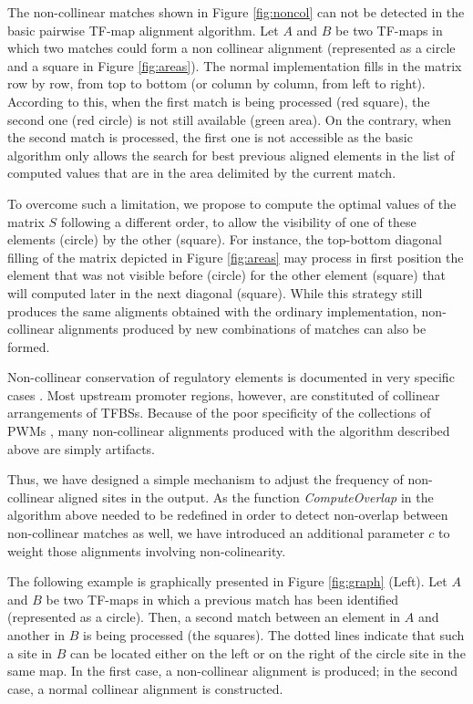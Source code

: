 
The non-collinear matches shown in Figure \ref{fig:noncol} can not be detected
in the basic pairwise TF-map alignment algorithm. Let $A$ and $B$ be two
TF-maps in which two matches could form a non collinear alignment
(represented as a circle and a square in Figure \ref{fig:areas}). The
normal implementation fills in the matrix row by row, from top to bottom
(or column by column, from left to right).
According to this, when the first match is being processed (red square),
the second one (red circle) is not still available (green area). On the
contrary, when the second match is processed, the first one is not
accessible as the basic algorithm only allows the search for best previous
aligned elements in the list of computed values that are in the area
delimited by the current match.

To overcome such a limitation, we propose to compute the optimal values of the
matrix $S$ following a different order, to allow the visibility of one of
these elements (circle) by the other (square). For instance, the top-bottom
diagonal filling of the matrix depicted in Figure \ref{fig:areas} may process
in first position the element that was not visible before (circle) for the
other element (square) that will computed later in the next diagonal (square).
While this strategy still produces the same aligments obtained with the
ordinary implementation, non-collinear alignments produced by new
combinations of matches can also be formed.

Non-collinear conservation of regulatory elements is documented
in very specific cases \citep{nix:2005a}. Most upstream promoter
regions, however, are constituted of collinear arrangements of TFBSs.
Because of the poor specificity of the collections of PWMs \citep{schones:2005a}, 
many non-collinear alignments produced with the algorithm described above 
are simply artifacts. 

Thus, we have designed a simple mechanism to adjust the frequency of
non-collinear aligned sites in the output. As the function \emph{ComputeOverlap}
in the algorithm above needed to be redefined in order to detect
non-overlap between non-collinear matches as well, we have introduced
an additional parameter $c$ to weight those alignments involving
non-colinearity.

The following example is graphically presented in Figure \ref{fig:graph} (Left).
Let $A$ and $B$ be two TF-maps in which a previous match has been 
identified (represented as a circle). Then, a second match between 
an element in $A$ and another in $B$ is being processed (the squares).
The dotted lines indicate that such a site in $B$ can be located either 
on the left or on the right of the circle site in the same map. In the
first case, a non-collinear alignment is produced; in the second case,
a normal collinear alignment is constructed. 

